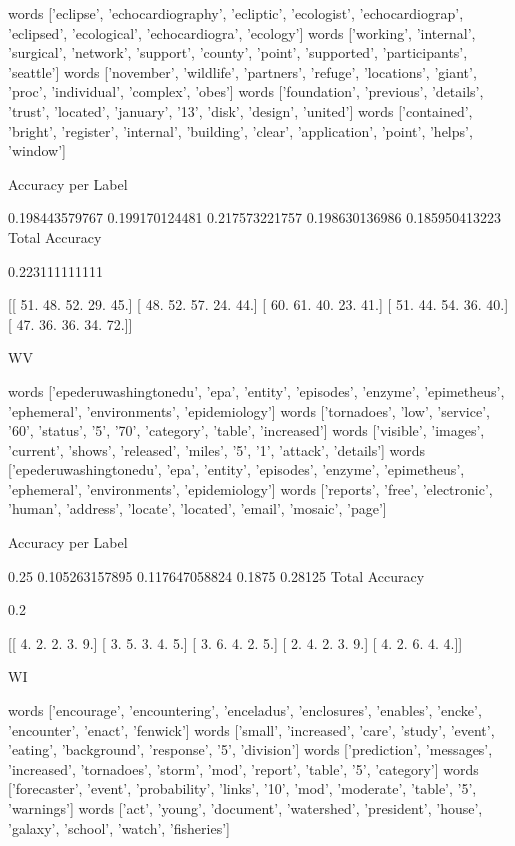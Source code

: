 \documentclass[11pt]{article}
\begin{document}
\begin{verbatium}
words
['eclipse', 'echocardiography', 'ecliptic', 'ecologist', 'echocardiograp', 'eclipsed', 'ecological', 'echocardiogra', 'ecology']
words
['working', 'internal', 'surgical', 'network', 'support', 'county', 'point', 'supported', 'participants', 'seattle']
words
['november', 'wildlife', 'partners', 'refuge', 'locations', 'giant', 'proc', 'individual', 'complex', 'obes']
words
['foundation', 'previous', 'details', 'trust', 'located', 'january', '13', 'disk', 'design', 'united']
words
['contained', 'bright', 'register', 'internal', 'building', 'clear', 'application', 'point', 'helps', 'window']

Accuracy per Label

0.198443579767
0.199170124481
0.217573221757
0.198630136986
0.185950413223
Total Accuracy

0.223111111111


[[ 51.  48.  52.  29.  45.]
 [ 48.  52.  57.  24.  44.]
 [ 60.  61.  40.  23.  41.]
 [ 51.  44.  54.  36.  40.]
 [ 47.  36.  36.  34.  72.]]


WV


words
['epederuwashingtonedu', 'epa', 'entity', 'episodes', 'enzyme', 'epimetheus', 'ephemeral', 'environments', 'epidemiology']
words
['tornadoes', 'low', 'service', '60', 'status', '5', '70', 'category', 'table', 'increased']
words
['visible', 'images', 'current', 'shows', 'released', 'miles', '5', '1', 'attack', 'details']
words
['epederuwashingtonedu', 'epa', 'entity', 'episodes', 'enzyme', 'epimetheus', 'ephemeral', 'environments', 'epidemiology']
words
['reports', 'free', 'electronic', 'human', 'address', 'locate', 'located', 'email', 'mosaic', 'page']

Accuracy per Label

0.25
0.105263157895
0.117647058824
0.1875
0.28125
Total Accuracy

0.2


[[ 4.  2.  2.  3.  9.]
 [ 3.  5.  3.  4.  5.]
 [ 3.  6.  4.  2.  5.]
 [ 2.  4.  2.  3.  9.]
 [ 4.  2.  6.  4.  4.]]


WI


words
['encourage', 'encountering', 'enceladus', 'enclosures', 'enables', 'encke', 'encounter', 'enact', 'fenwick']
words
['small', 'increased', 'care', 'study', 'event', 'eating', 'background', 'response', '5', 'division']
words
['prediction', 'messages', 'increased', 'tornadoes', 'storm', 'mod', 'report', 'table', '5', 'category']
words
['forecaster', 'event', 'probability', 'links', '10', 'mod', 'moderate', 'table', '5', 'warnings']
words
['act', 'young', 'document', 'watershed', 'president', 'house', 'galaxy', 'school', 'watch', 'fisheries']


\end{verbatium}
\end{document}
